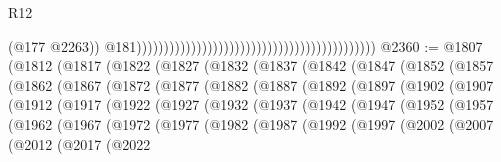 \begin{lexlean}{R12}
\begin{coremodule}
{{{{{{{{{{{{{{{{{{{{{{{{{{{{{{{{{{{{{{{{{{{{{{{{{{{{{{{{{{{{{{{{{{{{{{{{{{{{{{{{{{{{{{{{{{{{{{{{{{{{{{{{{{                                                                                              (@177
                                                                                                @2263))
                                                                                            @181))))))))))))))))))))))))))))))))))))))))))))
@2360 := @1807
    (@1812
      (@1817
        (@1822
          (@1827
            (@1832
              (@1837
                (@1842
                  (@1847
                    (@1852
                      (@1857
                        (@1862
                          (@1867
                            (@1872
                              (@1877
                                (@1882
                                  (@1887
                                    (@1892
                                      (@1897
                                        (@1902
                                          (@1907
                                            (@1912
                                              (@1917
                                                (@1922
                                                  (@1927
                                                    (@1932
                                                      (@1937
                                                        (@1942
                                                          (@1947
                                                            (@1952
                                                              (@1957
                                                                (@1962
                                                                  (@1967
                                                                    (@1972
                                                                      (@1977
                                                                        (@1982
                                                                          (@1987
                                                                            (@1992
                                                                              (@1997
                                                                                (@2002
                                                                                  (@2007
                                                                                    (@2012
                                                                                      (@2017
                                                                                        (@2022
}}}}}}}}}}}}}}}}}}}}}}}}}}}}}}}}}}}}}}}}}}}}}}}}}}}}}}}}}}}}}}}}}}}}}}}}}}}}}}}}}}}}}}}}}}}}}}}}}}}}}}}}}}
\end{coremodule}
\end{lexlean}
